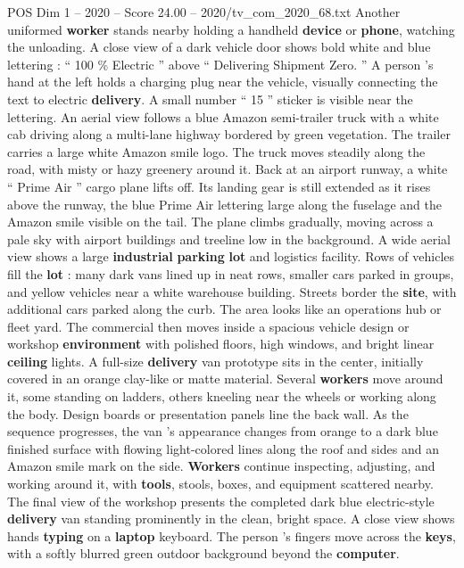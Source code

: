 \begin{textsample}{POS Dim 1 – 2020 – Score 24.00 – 2020/tv\_com\_2020\_68.txt}
Another uniformed \textbf{worker} stands nearby holding a handheld \textbf{device} or \textbf{phone}, watching the unloading.
A close view of a dark vehicle door shows bold white and blue lettering : “ 100 \% Electric ” above “ Delivering Shipment Zero. ” A person ’s hand at the left holds a charging plug near the vehicle, visually connecting the text to electric \textbf{delivery}.
A small number “ 15 ” sticker is visible near the lettering.
An aerial view follows a blue Amazon semi-trailer truck with a white cab driving along a multi-lane highway bordered by green vegetation.
The trailer carries a large white Amazon smile logo.
The truck moves steadily along the road, with misty or hazy greenery around it.
Back at an airport runway, a white “ Prime Air ” cargo plane lifts off.
Its landing gear is still extended as it rises above the runway, the blue Prime Air lettering large along the fuselage and the Amazon smile visible on the tail.
The plane climbs gradually, moving across a pale sky with airport buildings and treeline low in the background.
A wide aerial view shows a large \textbf{industrial} \textbf{parking} \textbf{lot} and logistics facility.
Rows of vehicles fill the \textbf{lot} : many dark vans lined up in neat rows, smaller cars parked in groups, and yellow vehicles near a white warehouse building.
Streets border the \textbf{site}, with additional cars parked along the curb.
The area looks like an operations hub or fleet yard.
The commercial then moves inside a spacious vehicle design or workshop \textbf{environment} with polished floors, high windows, and bright linear \textbf{ceiling} lights.
A full-size \textbf{delivery} van prototype sits in the center, initially covered in an orange clay-like or matte material.
Several \textbf{workers} move around it, some standing on ladders, others kneeling near the wheels or working along the body.
Design boards or presentation panels line the back wall.
As the sequence progresses, the van ’s appearance changes from orange to a dark blue finished surface with flowing light-colored lines along the roof and sides and an Amazon smile mark on the side. \textbf{Workers} continue inspecting, adjusting, and working around it, with \textbf{tools}, stools, boxes, and equipment scattered nearby.
The final view of the workshop presents the completed dark blue electric-style \textbf{delivery} van standing prominently in the clean, bright space.
A close view shows hands \textbf{typing} on a \textbf{laptop} keyboard.
The person ’s fingers move across the \textbf{keys}, with a softly blurred green outdoor background beyond the \textbf{computer}.

\end{textsample}

